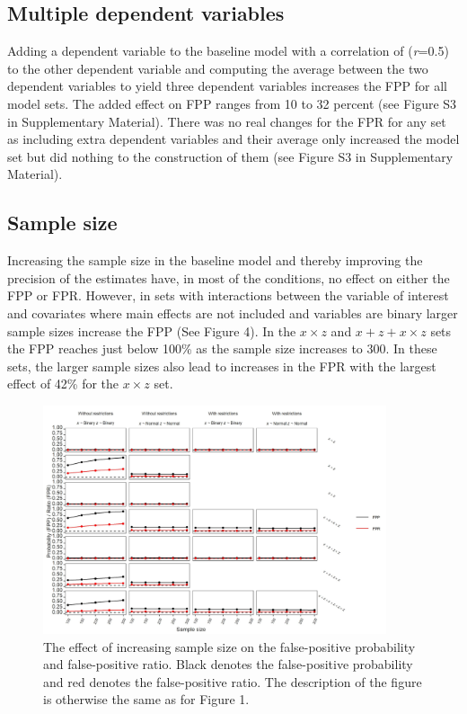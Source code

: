 \subsection{Multiple dependent variables}
Adding a dependent variable to the baseline model with a correlation of (\textit{r}=0.5) to the other dependent variable and computing the average between the two dependent variables to yield three dependent variables increases the FPP for all model sets. The added effect on FPP ranges from 10 to 32 percent (see Figure S3 in Supplementary Material). There was no real changes for the FPR for any set as including extra dependent variables and their average only increased the model set but did nothing to the construction of them (see Figure S3 in Supplementary Material).   

\subsection{Sample size}
Increasing the sample size in the baseline model and thereby improving the precision of the estimates have, in most of the conditions, no effect on either the FPP or FPR. However, in sets with interactions between the variable of interest and covariates where main effects are not included and variables are binary larger sample sizes increase the FPP (See Figure 4). In the $x \times z$ and $x + z+ x \times z$ sets the FPP reaches just below 100\% as the sample size increases to 300. In these sets, the larger sample sizes also lead to increases in the FPR with the largest effect of 42\% for the $x \times z$ set.  


\begin{figure}[hbt!]
\includegraphics[width=0.9\textwidth]{R/Analysis/Result/Figures/Figure1D.jpeg}
\centering
\caption{The effect of increasing sample size on the false-positive probability and false-positive ratio. Black denotes the false-positive probability and red denotes the false-positive ratio. The description of the figure is otherwise the same as for Figure 1.}
\label{fig:mainfigure}
\end{figure}

